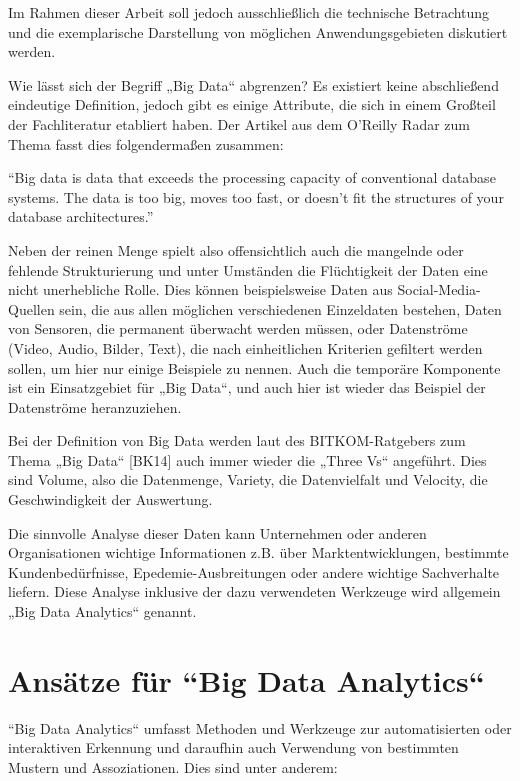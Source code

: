 	Im Rahmen dieser Arbeit soll jedoch ausschließlich die technische Betrachtung und die exemplarische Darstellung von möglichen Anwendungsgebieten diskutiert werden.




Wie lässt sich der Begriff „Big Data“ abgrenzen? Es existiert keine abschließend eindeutige Definition, jedoch gibt es einige Attribute, die sich in einem Großteil der Fachliteratur etabliert haben. Der Artikel aus dem O'Reilly Radar zum Thema  fasst dies folgendermaßen zusammen: 

\enquote{Big data is data that exceeds the processing capacity of conventional database systems. The data is too big, moves too fast, or doesn’t fit the structures of your database architectures.}

Neben der reinen Menge spielt also offensichtlich auch die mangelnde oder fehlende Strukturierung und unter Umständen die Flüchtigkeit der Daten eine nicht unerhebliche Rolle. Dies können beispielsweise Daten aus Social-Media-Quellen sein, die aus allen möglichen verschiedenen Einzeldaten bestehen, Daten von Sensoren, die permanent überwacht werden müssen, oder Datenströme (Video, Audio, Bilder, Text), die nach einheitlichen Kriterien gefiltert werden sollen, um hier nur einige Beispiele zu nennen. Auch die temporäre Komponente ist ein Einsatzgebiet für „Big Data“, und auch hier ist wieder das Beispiel der Datenströme heranzuziehen. 

Bei der Definition von Big Data werden laut des BITKOM-Ratgebers zum Thema „Big Data“ [BK14] auch immer wieder die „Three Vs“ angeführt. Dies sind Volume, also die Datenmenge, Variety, die Datenvielfalt und Velocity, die Geschwindigkeit der Auswertung. 

Die sinnvolle Analyse dieser Daten kann Unternehmen oder anderen Organisationen wichtige Informationen z.B. über Marktentwicklungen, bestimmte Kundenbedürfnisse, Epedemie-Ausbreitungen oder andere wichtige Sachverhalte liefern. Diese Analyse inklusive der dazu verwendeten Werkzeuge wird allgemein „Big Data Analytics“ genannt. 

\section{Ansätze für ``Big Data Analytics“}
\label{section:ansaetze für ``Big Data Analytics“}


``Big Data Analytics“ umfasst Methoden und Werkzeuge zur automatisierten oder interaktiven Erkennung und daraufhin auch Verwendung von bestimmten Mustern und Assoziationen. Dies sind unter anderem:

